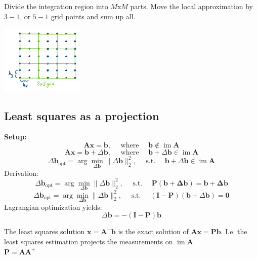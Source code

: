 \documentclass[english]{latex4ei/latex4ei_sheet}
\begin{document}
\begin{sectionbox}
  Divide the integration region into $M$x$M$ parts. Move the local approximation by $3-1$, or $5-1$ grid points and sum up all.
  \begin{center}\includegraphics[width = 4cm]{img/grid2.jpeg}\end{center}
\end{sectionbox}

\begin{sectionbox}
  \subsection{Least squares as a projection}
  \textbf{Setup:}
  $$\boldsymbol{A} \boldsymbol{x}=\boldsymbol{b}, \quad \text { where } \quad \boldsymbol{b} \notin \operatorname{im} \boldsymbol{A}$$
  $$\boldsymbol{A} \boldsymbol{x}=\boldsymbol{b}+ \Delta\boldsymbol{b}, \quad \text { where } \quad \boldsymbol{b}+\Delta\boldsymbol{b} \in \operatorname{im} \boldsymbol{A}$$
  $$\Delta \boldsymbol{b}_{\mathrm{opt}}=\arg \min _{\Delta \boldsymbol{b}}\|\Delta \boldsymbol{b}\|_{2}^{2}, \quad \text { s.t. } \quad \boldsymbol{b}+\Delta \boldsymbol{b} \in \operatorname{im} \boldsymbol{A}$$
  Derivation:
  $$\Delta \boldsymbol{b}_{\mathrm{opt}}=\arg \min _{\Delta \boldsymbol{b}}\|\Delta \boldsymbol{b}\|_{2}^{2}, \quad \text { s.t. } \quad \boldsymbol{P}(\boldsymbol{b}+\boldsymbol{\Delta b})=\boldsymbol{b+\Delta b}$$
  $$\Delta \boldsymbol{b}_{\mathrm{opt}}=\arg \min _{\Delta \boldsymbol{b}}\|\Delta \boldsymbol{b}\|_{2}^{2}, \quad \text { s.t. } \quad(\mathbf{I}-\boldsymbol{P})(\boldsymbol{b}+\Delta \boldsymbol{b})=\mathbf{0}$$
  Lagrangian optimization yields:
  $$\Delta \boldsymbol{b}=-(\mathbf{I}-\boldsymbol{P}) \boldsymbol{b}$$
  \begin{emphbox}
    The least squares solution $\boldsymbol{x} = \boldsymbol{A}^+\boldsymbol{b}$ is the exact solution of $\boldsymbol{A}\boldsymbol{x} = \boldsymbol{P}\boldsymbol{b}$. I.e. the least squares estimation projects the measurements on $\operatorname{im}\boldsymbol{A}$\\
    $\boldsymbol{P} = \boldsymbol{A}\boldsymbol{A}^+$
  \end{emphbox}
\end{sectionbox}
\end{document}
